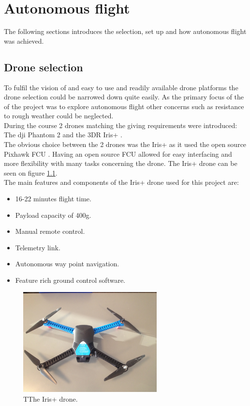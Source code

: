 \chapter{Autonomous flight}
The following sections introduces the selection, set up and how autonomous flight was achieved.

\section{Drone selection}
To fulfil the vision of and easy to use and readily available drone platforms the drone selection could be narrowed down quite easily. As the primary focus of the of the project was to explore autonomous flight other concerns such as resistance to rough weather could be neglected. \\
During the course 2 drones matching the giving requirements were introduced: The dji Phantom 2 \cite{Ref:dji} and the 3DR Iris+ \cite{Ref:3dr}.\\
The obvious choice between the 2 drones was the Iris+ as it used the open source Pixhawk FCU \cite{Ref:px4}. Having an open source FCU allowed for easy interfacing and more flexibility with many tasks concerning the drone. The Iris+ drone can be seen on figure \ref{fig:iris}.\\

The main features and components of the Iris+ drone used for this project are:
\begin{itemize}
\item 16-22 minutes flight time.
\item Payload capacity of 400g.
\item Manual remote control.
\item Telemetry link.
\item Autonomous way point navigation.
\item Feature rich ground control software.
\end{itemize}

\begin{figure}[H]
  \centering
    \includegraphics[width=0.65\textwidth]{./Images/iris}
  \caption{TThe Iris+ drone.}
  \label{fig:iris}
\end{figure}


